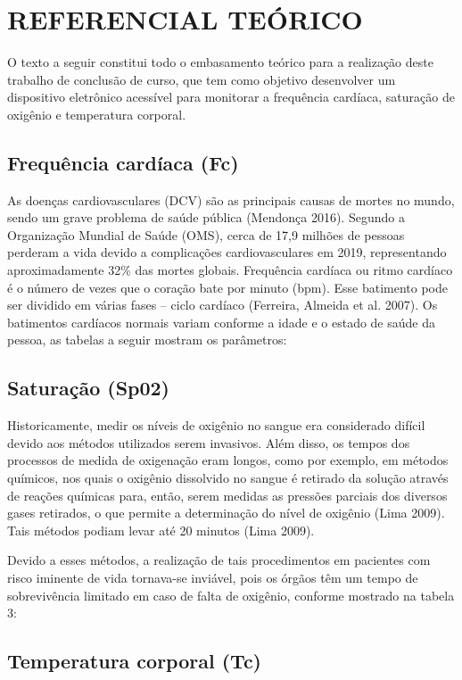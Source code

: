 \section{REFERENCIAL TEÓRICO}

O texto a seguir constitui todo o embasamento teórico para a realização deste trabalho de conclusão de curso, que tem como objetivo desenvolver um dispositivo eletrônico acessível para monitorar a frequência cardíaca, saturação de oxigênio e temperatura corporal.

\subsection{Frequência cardíaca (Fc)}

As doenças cardiovasculares (DCV) são as principais causas de mortes no mundo, sendo um grave problema de saúde pública (Mendonça 2016). Segundo a Organização Mundial de Saúde (OMS), cerca de 17,9 milhões de pessoas perderam a vida devido a complicações cardiovasculares em 2019, representando aproximadamente 32\% das mortes globais.
Frequência cardíaca ou ritmo cardíaco é o número de vezes que o coração bate por minuto (bpm). Esse batimento pode ser dividido em várias fases – ciclo cardíaco (Ferreira, Almeida et al. 2007). Os batimentos cardíacos normais variam conforme a idade e o estado de saúde da pessoa, as tabelas a seguir mostram os parâmetros:

\subsection{Saturação (Sp02)}

Historicamente, medir os níveis de oxigênio no sangue era considerado difícil devido aos métodos utilizados serem invasivos. Além disso, os tempos dos processos de medida de oxigenação eram longos, como por exemplo, em métodos químicos, nos quais o oxigênio dissolvido no sangue é retirado da solução através de reações químicas para, então, serem medidas as pressões parciais dos diversos gases retirados, o que permite a determinação do nível de oxigênio (Lima 2009). Tais métodos podiam levar até 20 minutos (Lima 2009).

Devido a esses métodos, a realização de tais procedimentos em pacientes com risco iminente de vida tornava-se inviável, pois os órgãos têm um tempo de sobrevivência limitado em caso de falta de oxigênio, conforme mostrado na tabela 3:

\subsection{Temperatura corporal (Tc)}

